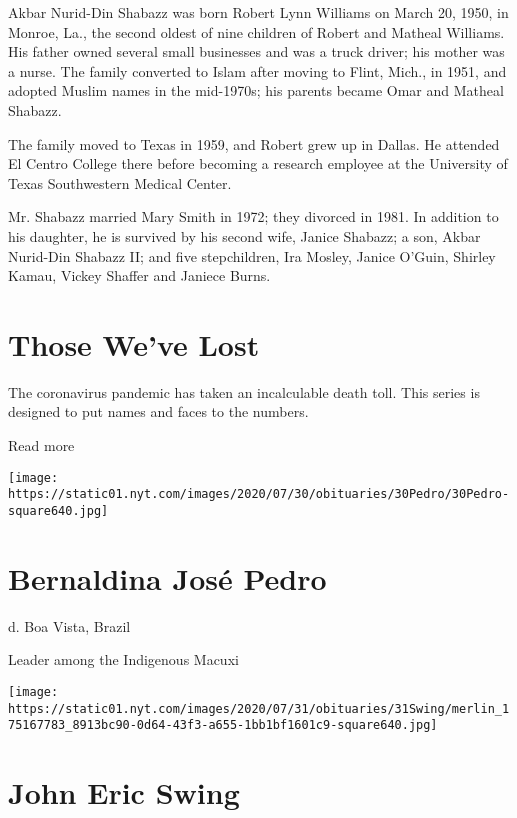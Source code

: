 Akbar Nurid-Din Shabazz was born Robert Lynn Williams on March 20, 1950,
in Monroe, La., the second oldest of nine children of Robert and Matheal
Williams. His father owned several small businesses and was a truck
driver; his mother was a nurse. The family converted to Islam after
moving to Flint, Mich., in 1951, and adopted Muslim names in the
mid-1970s; his parents became Omar and Matheal Shabazz.

The family moved to Texas in 1959, and Robert grew up in Dallas. He
attended El Centro College there before becoming a research employee at
the University of Texas Southwestern Medical Center.

Mr. Shabazz married Mary Smith in 1972; they divorced in 1981. In
addition to his daughter, he is survived by his second wife, Janice
Shabazz; a son, Akbar Nurid-Din Shabazz II; and five stepchildren, Ira
Mosley, Janice O'Guin, Shirley Kamau, Vickey Shaffer and Janiece Burns.

\href{https://www.nytimes.com/interactive/2020/obituaries/people-died-coronavirus-obituaries.html?action=click\&pgtype=Article\&state=default\&region=BELOW_MAIN_CONTENT\&context=covid_obits_promo}{}

\hypertarget{those-weve-lost}{%
\section{Those We've Lost}\label{those-weve-lost}}

The coronavirus pandemic has taken an incalculable death toll. This
series is designed to put names and faces to the numbers.

Read more

\texttt{[image: https://static01.nyt.com/images/2020/07/30/obituaries/30Pedro/30Pedro-square640.jpg]}

\hypertarget{bernaldina-josuxe9-pedro}{%
\section{Bernaldina José Pedro}\label{bernaldina-josuxe9-pedro}}

d. Boa Vista, Brazil

Leader among the Indigenous Macuxi

\texttt{[image: https://static01.nyt.com/images/2020/07/31/obituaries/31Swing/merlin\_175167783\_8913bc90-0d64-43f3-a655-1bb1bf1601c9-square640.jpg]}

\hypertarget{john-eric-swing}{%
\section{John Eric Swing}\label{john-eric-swing}}

